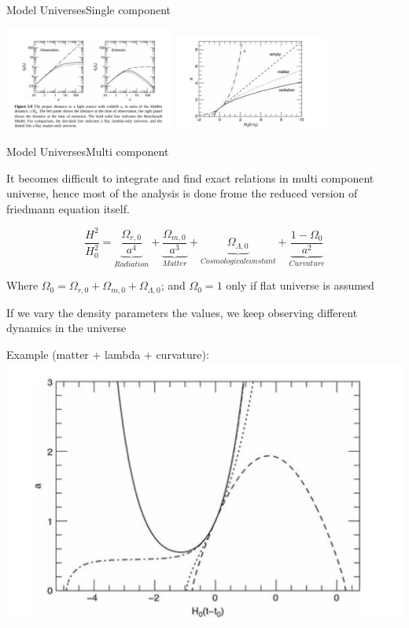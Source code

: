 \begin{frame}{Model Universes}{Single component}

\includegraphics[width=2.2in]{3}
\includegraphics[width=2in]{6}

\end{frame}

\begin{frame}{Model Universes}{Multi component}

	It becomes difficult to integrate and find exact relations in multi
	component universe, hence most of the analysis is done frome the reduced
	version of friedmann equation itself.

	$$ \frac{H^2}{H_0^2} = \underbrace{\frac{\Omega_{r,0}}{a^4}}_{Radiation} +
	\underbrace{\frac{\Omega_{m,0}}{a^3}}_{Matter}
	+ \underbrace{\Omega_{\Lambda,0}}_{Cosmological constant} +
	\underbrace{\frac{1 - \Omega_{0}}{a^2}}_{Curvature} $$

	Where $\Omega_0 = \Omega_{r,0} + \Omega_{m,0} + \Omega_{\Lambda,0}$;
	and $\Omega_0 = 1 $ only if flat universe is   assumed

	If we vary the density parameters the values, we keep observing
	different dynamics in the universe
\end{frame}

\begin{frame}
	Example (matter + lambda + curvature):
	\includegraphics[width=\textwidth]{4}
\end{frame}

